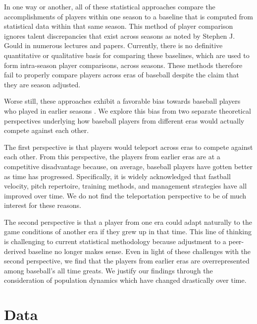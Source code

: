 \documentclass[11pt]{article}\usepackage[]{graphicx}\usepackage[]{color}
\begin{document}
In one way or another, all of these statistical approaches compare the  
accomplishments of players within one season to a baseline that 
is computed from statistical data within that same season.  
This method of player comparison ignores talent discrepancies that exist across 
seasons as noted by Stephen J. Gould in numerous lectures and papers.
Currently, there is no definitive quantitative or qualitative basis for 
comparing these baselines, which are used to form intra-season player 
comparisons, across seasons.  These methods therefore fail to properly 
compare players across eras of baseball despite the claim that they are 
season adjusted.  

Worse still, these approaches exhibit a favorable bias towards baseball 
players who played in earlier seasons 
\citep{schmidt2005concentration}.  
We explore this bias from two separate theoretical perspectives underlying how 
baseball players from different eras would actually compete against each 
other.  

The first perspective is that players would teleport across eras to 
compete against each other.  From this perspective, the players from earlier eras 
are at a competitive disadvantage because, on average, baseball players have 
gotten better as time has progressed.
Specifically, it is widely acknowledged that 
fastball velocity, pitch repertoire, training methods, and management 
strategies have all improved over time.  
We do not find the teleportation perspective to be of 
much interest for these reasons.  

The second perspective is that a player from 
one era could adapt naturally to the game conditions of another era if they 
grew up in that time. 
This line of thinking is challenging to current statistical methodology because 
adjustment to a peer-derived baseline no longer makes sense. 
Even in light of these challenges with the second perspective, we find that the 
players from earlier eras are overrepresented among baseball's all time greats.  
We justify our findings through the consideration of population dynamics which 
have changed drastically over time.  %



\section{Data}
\end{document}

